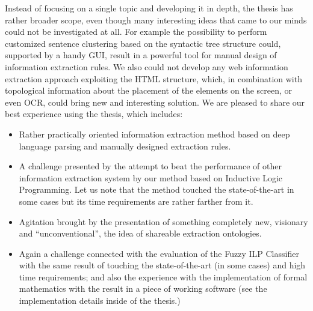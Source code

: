 \documentclass[12pt,a4paper,twoside,notitlepage]{article}
\begin{document}
Instead of focusing on a single topic and developing it in depth, the thesis has rather broader scope, even though many interesting ideas that came to our minds could not be investigated at all. For example the possibility to perform customized sentence clustering based on the syntactic tree structure could, supported by a handy GUI, result in a powerful tool for manual design of information extraction rules. We also could not develop any web information extraction approach exploiting the HTML structure, which, in combination with topological information about the placement of the elements on the screen, or even OCR, could bring new and interesting solution. We are pleased to share our best experience using the thesis, which includes:

\begin{itemize}
	\item Rather practically oriented information extraction method based on deep language parsing and manually designed extraction rules.

	\item A challenge presented by the attempt to beat the performance of other information extraction system by our method based on Inductive Logic Programming.  Let us note that the method touched the state-of-the-art in some cases but its time requirements are rather farther from it.

	\item Agitation brought by the presentation of something completely new, visionary and ``unconventional'', the idea of shareable extraction ontologies.

	\item Again a challenge connected with the evaluation of the Fuzzy ILP Classifier with the same result of touching the state-of-the-art (in some cases) and high time requirements; and also the experience with the implementation of formal mathematics with the result in a piece of working software (see the implementation details inside of the thesis.)
\end{itemize}






\end{document}
